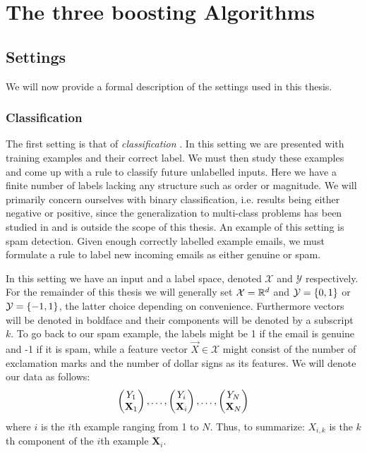 
\chapter{The three boosting Algorithms}
\label{chap:prelim}
\section{Settings}
We will now provide a formal description of the settings used in this thesis.
\subsection{Classification} 
\label{subsec:class}
\par The first setting is that of \textit{classification} \cite{Hastie2009}. In this setting we are presented with training examples and their correct label. We must then study these examples and come up with a rule to classify future unlabelled inputs. Here we have a finite number of labels lacking any structure such as order or magnitude. We will primarily concern ourselves with binary classification, i.e. results being either negative or positive, since the generalization to multi-class problems has been studied in \cite{Freund1997} and is outside the scope of this thesis. An example of this setting is spam detection. Given enough correctly labelled example emails, we must formulate a rule to label new incoming emails as either genuine or spam. 
\par In this setting we have an input and a label space, denoted $\mathcal X$ and $\mathcal Y$ respectively. For the remainder of this thesis we will generally set $\mathcal X = \R^d$ and $\mathcal Y = \set{0,1}$ or $\mathcal Y = \set{-1,1}$, the latter choice depending on convenience. 
Furthermore vectors will be denoted in boldface and their components will be denoted by a subscript $k$. To go back to our spam example, the labels might be 1 if the email is genuine and -1 if it is spam, while a feature vector $\vec X\in \mathcal X$ might consist of the number of exclamation marks and the number of dollar signs as its features. We will denote our data as follows: $$\Vec{Y_1\\ \mathbf X_1},\ldots, \Vec{Y_i\\ \mathbf X_i},\ldots,\Vec{Y_N\\ \mathbf X_N}$$ where $i$ is the $i$th example ranging from 1 to $N$. Thus, to summarize: $X_{i,k}$ is the $k$th component of the $i$th example $\mathbf X_i$. 

